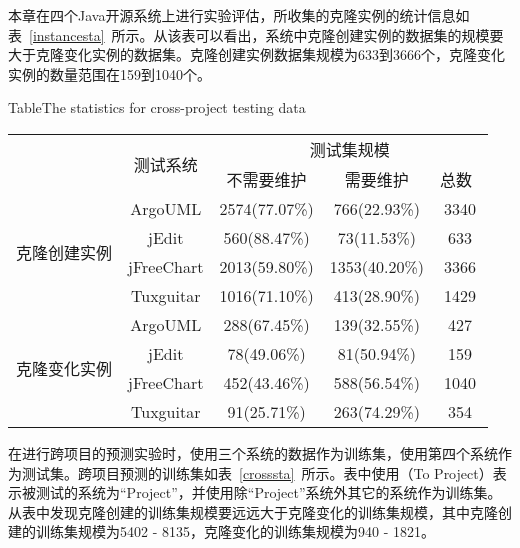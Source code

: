 本章在四个Java开源系统上进行实验评估，所收集的克隆实例的统计信息如表~\ref{instancesta}~所示。从该表可以看出，系统中克隆创建实例的数据集的规模要大于克隆变化实例的数据集。克隆创建实例数据集规模为633到3666个，克隆变化实例的数量范围在159到1040个。

\begin{table}[h]
{Table$\!$}{The statistics for cross-project testing data}
\vspace{0.5em}
\centering
\wuhao
\begin{tabular}{ccccc}
\toprule[1.5pt]
~\multirow{2}{*}{类型}&\multirow{2}{*}{测试系统}&\multicolumn{3}{c}{测试集规模}\\
\cline{3-5}
~&~&{不需要维护}&{需要维护}&{总数}~\\
\midrule[1pt]
\multirow{4}{*}{克隆创建实例}
&ArgoUML&	2574(77.07\%)&	766(22.93\%)&	3340\\
&jEdit&560(88.47\%)&	73(11.53\%)&	633\\
&jFreeChart&	2013(59.80\%)&	1353(40.20\%)&	3366\\
&Tuxguitar&	1016(71.10\%)&	413(28.90\%)&	1429\\
\hline
\multirow{4}{*}{克隆变化实例}
&ArgoUML&288(67.45\%)&139(32.55\%)&427\\
&jEdit&78(49.06\%)&81(50.94\%)&159\\
&jFreeChart&452(43.46\%)&588(56.54\%)&1040\\
&Tuxguitar&91(25.71\%)&263(74.29\%)&354\\
\bottomrule[1.5pt]
\end{tabular}
\end{table}

在进行跨项目的预测实验时，使用三个系统的数据作为训练集，使用第四个系统作为测试集。跨项目预测的训练集如表~\ref{crosssta}~所示。表中使用（To Project）表示被测试的系统为“Project”，并使用除“Project”系统外其它的系统作为训练集。从表中发现克隆创建的训练集规模要远远大于克隆变化的训练集规模，其中克隆创建的训练集规模为5402 - 8135，克隆变化的训练集规模为940 - 1821。

